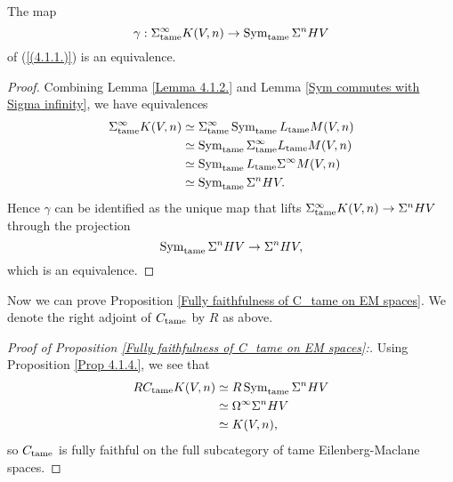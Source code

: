 \begin{proposition}
\label{Prop 4.1.4.}
The map 
$$
\gamma:  \Sigma^{\infty}_{\operatorname{\operatorname{tame}}}K(V,n)\to \operatorname{Sym}_{\operatorname{\operatorname{tame}}} \Sigma^{n}HV
$$
of (\ref{(4.1.1.)}) is an equivalence.
\end{proposition}

\begin{proof}
Combining Lemma \ref{Lemma 4.1.2.} and Lemma \ref{Sym commutes with Sigma infinity}, we have equivalences
\begin{align*}
	\Sigma_{\operatorname{\operatorname{tame}}}^{\infty} K(V,n) 
& \simeq \Sigma_{\operatorname{\operatorname{tame}}}^{\infty} \operatorname{Sym}_{\operatorname{\operatorname{tame}}}L_{\operatorname{\operatorname{tame}}} M(V,n)\\
& \simeq   \operatorname{Sym}_{\operatorname{\operatorname{tame}}} \Sigma_{\operatorname{\operatorname{tame}}}^{\infty}L_{\operatorname{\operatorname{tame}}}M(V,n)\\
& \simeq   \operatorname{Sym}_{\operatorname{\operatorname{tame}}} L_{\operatorname{\operatorname{tame}}} \Sigma^{\infty}M(V,n)\\
& \simeq \operatorname{Sym}_{\operatorname{\operatorname{tame}}} \Sigma^n HV.
\end{align*}
Hence $\gamma$ can be identified as the unique map that lifts $\Sigma^{\infty}_{\operatorname{\operatorname{tame}}}K(V,n) \to \Sigma^n HV$ through the projection
$$
\operatorname{Sym}_{\operatorname{\operatorname{tame}}} \Sigma^n HV \to \Sigma^n HV,
$$
which is an equivalence.
\end{proof}


Now we can prove Proposition \ref{Fully faithfulness of C_tame on EM spaces}. We denote the right adjoint of $C_{\operatorname{\operatorname{tame}}}$ by $R$ as above.
\begin{proof}
[Proof of Proposition \ref{Fully faithfulness of C_tame on EM spaces}:]
Using Proposition \ref{Prop 4.1.4.}, we see that
\begin{align*}
    R C_{\operatorname{\operatorname{tame}}} K(V,n) & \simeq R\operatorname{Sym}_{\operatorname{\operatorname{tame}}}\Sigma^n HV \\
    & \simeq \Omega^\infty \Sigma^n HV\\
    & \simeq K(V,n),
\end{align*}
    so $C_{\operatorname{\operatorname{tame}}}$ is fully faithful on the full subcategory of tame Eilenberg-Maclane spaces.
    
\end{proof}

















